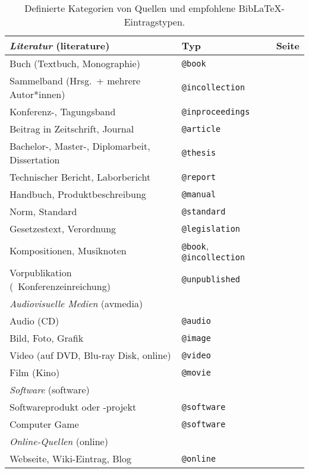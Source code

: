 \begin{table}
\caption{Definierte Kategorien von Quellen und empfohlene BibLaTeX-Eintragstypen.}
\label{tab:QuellenUndEintragstypen}
\centering
\begin{tabular}{@{}llc@{}}
	\toprule
	\emph{Literatur} (\textsf{literature}) & Typ & Seite\\
	\midrule
	Buch (Textbuch, Monographie) & \texttt{@book} & \pageref{sec:@book}\\
	Sammelband (Hrsg.\ + mehrere Autor*innen) & \texttt{@incollection} & \pageref{sec:@incollection} \\
	Konferenz-, Tagungsband & \texttt{@inproceedings} & \pageref{sec:@inproceedings}\\
	Beitrag in Zeitschrift, Journal & \texttt{@article} & \pageref{sec:@article}\\
	Bachelor-, Master-, Diplomarbeit, Dissertation & \texttt{@thesis} & \pageref{sec:@thesis}\\
	Technischer Bericht, Laborbericht & \texttt{@report} & \pageref{sec:@report}\\
	Handbuch, Produktbeschreibung & \texttt{@manual} & \pageref{sec:@manual}\\
	Norm, Standard & \texttt{@standard} & \pageref{sec:@standard}\\
	Gesetzestext, Verordnung \etc & \texttt{@legislation} & \pageref{sec:@legislation}\\
	Kompositionen, Musiknoten & \texttt{@book}, \texttt{@incollection} & \pageref{sec:Musiknoten}\\
	Vorpublikation (\zB\ Konferenzeinreichung) & \texttt{@unpublished} & \pageref{sec:@unpublished}\\
	\addlinespace
%
	\midrule
	\emph{Audiovisuelle Medien} (\textsf{avmedia}) & & \\
	\midrule
	Audio (CD) & \texttt{@audio} & \pageref{sec:@audio}\\
	Bild, Foto, Grafik & \texttt{@image} & \pageref{sec:@image}\\
	Video (auf DVD, Blu-ray Disk, online) & \texttt{@video} & \pageref{sec:@video}\\
	Film (Kino) & \texttt{@movie} & \pageref{sec:@movie}\\
	\addlinespace
%
	\midrule
	\emph{Software} (\textsf{software}) & & \\
	\midrule
	Softwareprodukt oder -projekt & \texttt{@software} & \pageref{sec:@software}\\
	Computer Game & \texttt{@software} & \pageref{sec:@software}\\
	\addlinespace
%
	\midrule
	\emph{Online-Quellen} (\textsf{online}) & & \\
	\midrule
	Webseite, Wiki-Eintrag, Blog \etc & \texttt{@online} & \pageref{sec:@online-www} \\
	\bottomrule
\end{tabular}
\end{table}

